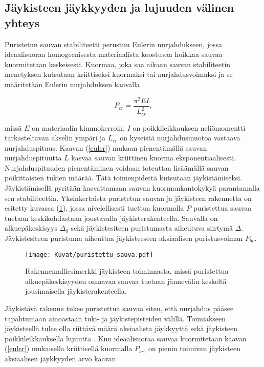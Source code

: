 \documentclass[12pt]{article}
\newenvironment{content}{\pagenumbering{arabic}}{}
\begin{document}
\begin{content}
\subsection{Jäykisteen jäykkyyden ja lujuuden välinen yhteys}

Puristetun sauvan stabiliteetti perustuu Eulerin nurjahdukseen, jossa ideaalisuoraa homogeenisesta materiaalista koostuvaa hoikkaa sauvaa kuormitetaan keskeisesti. Kuormaa, joka saa aikaan sauvan stabiliteetin menetyksen kutsutaan kriittiseksi kuormaksi tai nurjahdusvoimaksi ja se määritetään Eulerin nurjahduksen kaavalla

\begin{equation}
\label{euler}
P_{cr} = \frac{\pi^2 E I}{L_{cr}^2},
\end{equation}

missä $E$ on materiaalin kimmokerroin, $I$ on poikkileikkauksen neliömomentti tarkasteltavan akselin ympäri ja $L_{cr}$ on kyseistä nurjahdusmuotoa vastaava nurjahduspituus. Kaavan (\ref{euler}) mukaan pienentämällä sauvan nurjahduspituutta $L$ kasvaa sauvan kriittinen kuorma eksponentiaalisesti. Nurjahduspituuden pienentäminen voidaan toteuttaa lisäämällä sauvan poikittaisten tukien määrää. Tätä toimenpidettä kutsutaan jäykistämiseksi. Jäykistämisellä pyritään kasvattamaan sauvan kuormankantokykyä parantamalla sen stabiliteettia. Yksinkertaista puristetun sauvan ja jäykisteen rakennetta on esitetty kuvassa (\ref{fig:puristettu_sauva}), jossa nivelellisesti tuettua kuormalla $P$ puristettua sauvaa tuetaan keskikohdastaan joustavalla jäykisterakenteella. Sauvalla on alkuepäkeskisyys $\Delta_0$ sekä jäykistesiteen puristumasta aiheutuva siirtymä $\Delta$. Jäykistesiteen puristuma aiheuttaa jäykisteeseen aksiaalisen puristusvoiman $P_{br}$.

\begin{figure}[htb]
\centering
\texttt{[image: Kuvat/puristettu\_sauva.pdf]}
\caption{Rakennemalliesimerkki jäykisteen toiminnasta, missä puristettua alkuepäkeskisyyden omaavaa sauvaa tuetaan jännevälin keskeltä jousimaisella jäykisterakenteella.}
\label{fig:puristettu_sauva}
\end{figure}

Jäykistävä rakenne tukee puristettua sauvaa siten, että nurjahdus pääsee tapahtumaan ainoastaan tuki- ja jäykistepisteiden välillä. Toimiakseen jäykisteellä tulee olla riittävä määrä aksiaalista jäykkyyttä sekä jäykisteen poikkileikkauksella lujuutta \parencite{winter}. Kun ideaalisuoraa sauvaa kuormitetaan kaavan (\ref{euler}) mukaisella kriittisellä kuormalla $P_{cr}$, on pienin toimivan jäykisteen aksiaalisen jäykkyyden arvo kaavan


\end{content}
\end{document}
